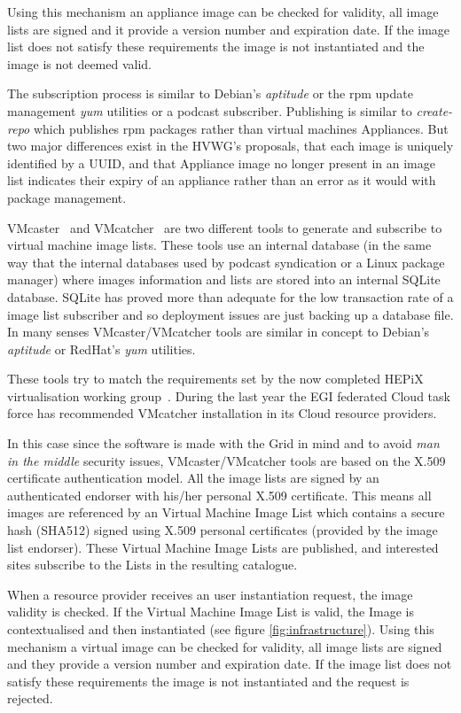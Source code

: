 \documentclass{cai}
\begin{document}
Using this mechanism an appliance image can be checked for validity, all image lists are signed and it provide a version number and expiration date. 
If the image list does not satisfy these requirements the image is not instantiated and the image is not deemed valid.

The subscription process is similar to Debian's \textit{aptitude} or the rpm update management \textit{yum} utilities or a podcast subscriber. 
Publishing is similar to \textit{create-repo} which publishes rpm packages rather than virtual machines Appliances. 
But two major differences exist in the HVWG's proposals, that each image is uniquely identified by a UUID, and that Appliance image no longer present in an image list indicates their expiry of an appliance rather than an error as it would with package management.


VMcaster~\cite{vmcaster} and VMcatcher~\cite{vmcatcher} are two different tools to generate and subscribe to virtual machine image lists.
These tools use an internal database (in the same way that the internal databases used by podcast syndication or a Linux package manager) where images information and lists are stored into an internal SQLite database.
SQLite has proved more than adequate for the low transaction rate of a image list subscriber and so deployment issues are just backing up a database file.
In many senses VMcaster/VMcatcher tools are similar in concept to Debian's \textit{aptitude} or RedHat's \textit{yum} utilities. 

These tools try to match the requirements set by the now completed HEPiX virtualisation working group~\cite{hepix}.
During the last year the EGI federated Cloud task force has recommended VMcatcher installation in its Cloud resource providers.

In this case since the software is made with the Grid in mind and to avoid {\it man in the middle} security issues, VMcaster/VMcatcher tools are based on the X.509 certificate authentication model.
All the image lists are signed by an authenticated endorser with his/her personal X.509 certificate. 
This means all images are referenced by an Virtual Machine Image List which contains a secure hash (SHA512) signed using X.509 personal certificates (provided by the image list endorser). 
These Virtual Machine Image Lists are published, and interested sites subscribe to the Lists in the resulting catalogue. 

When a resource provider receives an user instantiation request, the image validity is checked. If the Virtual Machine Image List is valid, the Image is contextualised and then instantiated (see figure \ref{fig:infrastructure}). 
Using this mechanism a virtual image can be checked for validity, all image lists are signed and they provide a version number and expiration date. If the image list does not satisfy these requirements the image is not instantiated and the request is rejected.
\end{document}

